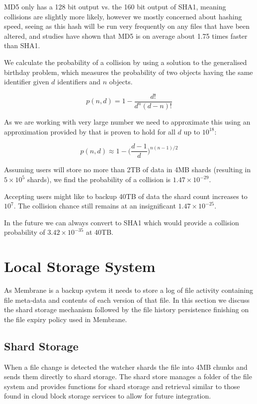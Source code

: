 \documentclass[11pt, a4paper, twoside]{report}
\begin{document}
MD5 only has a 128 bit output vs. the 160 bit output of SHA1, meaning collisions are slightly more likely, however we mostly concerned about hashing speed, seeing as this hash will be run very frequently on any files that have been altered, and studies have shown that MD5 is on average about 1.75 times faster than SHA1. \citep{saphir2007securite}

We calculate the probability of a collision by using a solution to the generalised birthday problem, which measures the probability of two objects having the same identifier given $d$ identifiers and $n$ objects.

$$p(n, d) = 1 - \frac{d!}{d^{n}(d - n)!}$$

As we are working with very large number we need to approximate this using an approximation provided by \cite{brink2012probably} that is proven to hold for all $d$ up to $10^{18}$:

$$p(n, d) \approx 1 - \bigg(\frac{d-1}{d}\bigg)^{n(n-1)/2}$$

Assuming users will store no more than 2TB of data in 4MB shards (resulting in $5 \times 10^5$ shards), we find the probability of a collision is $1.47 \times 10^{-29}$.

Accepting users might like to backup 40TB of data the shard count increases to $10^{7}$. The collision chance still remains at an insignificant $1.47 \times 10^{-25}$.

In the future we can always convert to SHA1 which would provide a collision probability of $3.42 \times 10^{-35}$ at 40TB.

\section{Local Storage System}

As Membrane is a backup system it needs to store a log of file activity containing file meta-data and contents of each version of that file. In this section we discuss the shard storage mechanism followed by the file history persistence finishing on the file expiry policy used in Membrane.

\subsection{Shard Storage}

When a file change is detected the watcher shards the file into 4MB chunks and sends them directly to shard storage. The shard store manages a folder of the file system and provides functions for shard storage and retrieval similar to those found in cloud block storage services to allow for future integration.
\end{document}
